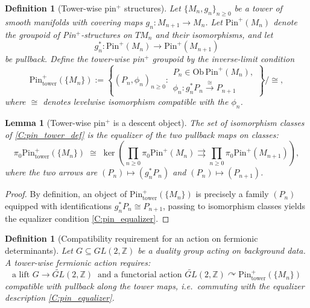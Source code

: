 \documentclass[11pt]{article}
\newtheorem{lemma}[theorem]{Lemma}
\newtheorem{definition}[theorem]{Definition}
\theoremstyle{remark}
\begin{document}
\begin{definition}[Tower-wise pin$^{+}$ structures]
Let $\{M_{n},g_{n}\}_{n\ge 0}$ be a tower of smooth manifolds with covering maps $g_{n}:M_{n+1}\to M_{n}$.
Let $\mathrm{Pin}^{+}(M_{n})$ denote the groupoid of Pin$^{+}$-structures on $TM_{n}$ and their isomorphisms, and let
\begin{equation}
g_{n}^{\ast}:\mathrm{Pin}^{+}(M_{n})\to \mathrm{Pin}^{+}(M_{n+1})
\label{C:pullback_pin}
\end{equation}
be pullback.
Define the tower-wise pin$^{+}$ groupoid by the inverse-limit condition
\begin{equation}
\mathrm{Pin}^{+}_{\mathrm{tower}}(\{M_{n}\})
:=
\left\{
(P_{n},\phi_{n})_{n\ge 0}:
\begin{array}{l}
P_{n}\in \mathrm{Ob}\,\mathrm{Pin}^{+}(M_{n}),\\
\phi_{n}:g_{n}^{\ast}P_{n}\xrightarrow{\ \cong\ }P_{n+1}
\end{array}
\right\}\Big/\cong,
\label{C:pin_tower_def}
\end{equation}
where $\cong$ denotes levelwise isomorphism compatible with the $\phi_{n}$.
\end{definition}

\begin{lemma}[Tower-wise pin$^{+}$ is a descent object]
\label{C:pin_tower_equalizer}
The set of isomorphism classes of \eqref{C:pin_tower_def} is the equalizer of the two pullback maps on classes:
\begin{equation}
\pi_{0}\mathrm{Pin}^{+}_{\mathrm{tower}}(\{M_{n}\})
\;\cong\;
\ker\!\left(
\prod_{n\ge 0}\pi_{0}\mathrm{Pin}^{+}(M_{n})
\rightrightarrows
\prod_{n\ge 0}\pi_{0}\mathrm{Pin}^{+}(M_{n+1})
\right),
\label{C:pin_equalizer}
\end{equation}
where the two arrows are $(P_{n})\mapsto (g_{n}^{\ast}P_{n})$ and $(P_{n})\mapsto (P_{n+1})$.
\end{lemma}

\begin{proof}
By definition, an object of $\mathrm{Pin}^{+}_{\mathrm{tower}}(\{M_{n}\})$ is precisely a family $(P_{n})$ equipped with identifications $g_{n}^{\ast}P_{n}\cong P_{n+1}$, passing to isomorphism classes yields the equalizer condition \eqref{C:pin_equalizer}.
\end{proof}

\begin{definition}[Compatibility requirement for an action on fermionic determinants]
Let $G\subseteq GL(2,\mathbb Z)$ be a duality group acting on background data.
A tower-wise fermionic action requires:
\begin{equation}
\text{a lift }G\to \widetilde{GL}(2,\mathbb Z)\ \text{ and a functorial action }
\widetilde{GL}(2,\mathbb Z)\curvearrowright \mathrm{Pin}^{+}_{\mathrm{tower}}(\{M_{n}\})
\label{C:lift_action_req}
\end{equation}
compatible with pullback along the tower maps, i.e.\ commuting with the equalizer description \eqref{C:pin_equalizer}.
\end{definition}
\end{document}
